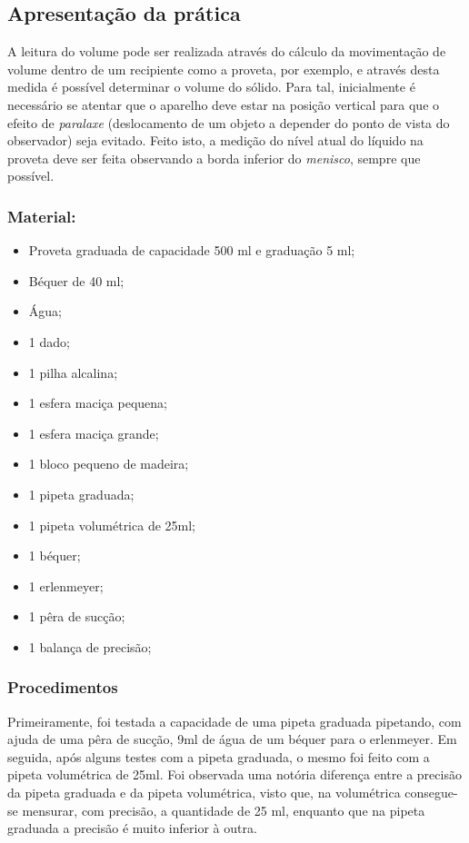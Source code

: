 \documentclass[12pt]{article}
\begin{document}
\subsection{Apresentação da prática}
	A leitura do volume pode ser realizada através do cálculo da movimentação de volume dentro de um recipiente como a proveta, por exemplo, e através desta medida é possível determinar o volume do sólido.
    Para tal, inicialmente é necessário se atentar que o aparelho deve estar na posição vertical para que o efeito de \textit{paralaxe} (deslocamento de um objeto a depender do ponto de vista do observador) seja evitado. Feito isto, a medição do nível atual do líquido na proveta deve ser feita observando a borda inferior do \textit{menisco}, sempre que possível. 
\subsubsection{Material:}
\begin{itemize}
\item Proveta graduada de capacidade 500 ml e graduação 5 ml;
\item Béquer de 40 ml;
\item Água;
\item 1 dado;
\item 1 pilha alcalina;
\item 1 esfera maciça pequena;
\item 1 esfera maciça grande;
\item 1 bloco pequeno de madeira;
\item 1 pipeta graduada;
\item 1 pipeta volumétrica de 25ml;
\item 1 béquer;
\item 1 erlenmeyer;
\item 1 pêra de sucção;
\item 1 balança de precisão;
\end{itemize}

\subsubsection{Procedimentos}
	Primeiramente, foi testada a capacidade de uma pipeta graduada pipetando, com ajuda de uma pêra de sucção, 9ml de água de um béquer para o erlenmeyer. Em seguida, após alguns testes com a pipeta graduada, o mesmo foi feito com a pipeta volumétrica de 25ml. Foi observada uma notória diferença entre a precisão da pipeta graduada e da pipeta volumétrica, visto que, na volumétrica consegue-se mensurar, com precisão, a quantidade de 25 ml, enquanto que na pipeta graduada a precisão é muito inferior à outra. 
    
\end{document}
